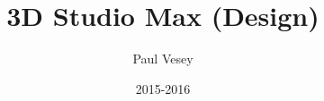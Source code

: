 


%
 {
}





\usepackage{eurosym}
\usepackage{graphicx}
\usepackage{wasysym}
\usepackage{listings}
\usepackage{pxfonts}
\usepackage{verbatim}
\usepackage{color}
\usepackage{xcolor}
\usepackage{wrapfig}
\usepackage{hyperref}
\usepackage[nomain, xindy, toc, acronym]{glossaries}



\makeglossaries{}
\usepackage[xindy]{imakeidx}
\makeindex




%

%
%






%
\title[3D Studio Max (Design)]{3D Studio Max (Design)}
%
\author{Paul Vesey}
\date{2015-2016}


